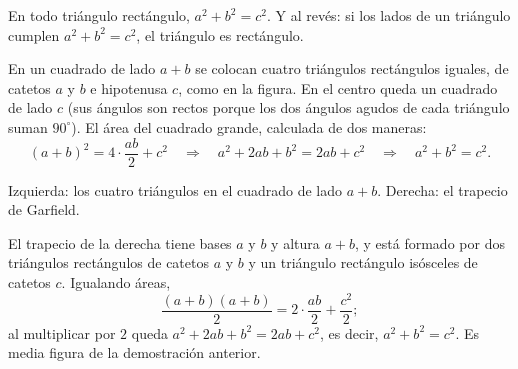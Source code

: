 \documentclass[11pt]{article}
\begin{document}
\begin{teorema}
En todo triángulo rectángulo, $a^2 + b^2 = c^2$. Y al revés: si los lados
de un triángulo cumplen $a^2 + b^2 = c^2$, el triángulo es rectángulo.
\end{teorema}

\begin{ejemplo}
En un cuadrado de lado $a + b$ se colocan cuatro triángulos rectángulos
iguales, de catetos $a$ y $b$ e hipotenusa $c$, como en la figura. En el
centro queda un cuadrado de lado $c$ (sus ángulos son rectos porque los dos
ángulos agudos de cada triángulo suman $90^\circ$). El área del cuadrado
grande, calculada de dos maneras:
\[
  (a + b)^2 = 4 \cdot \frac{ab}{2} + c^2
  \quad\Longrightarrow\quad a^2 + 2ab + b^2 = 2ab + c^2
  \quad\Longrightarrow\quad a^2 + b^2 = c^2.
\]
\end{ejemplo}

\begin{center}

{\small Izquierda: los cuatro triángulos en el cuadrado de lado $a + b$.
Derecha: el trapecio de Garfield.}
\end{center}

\begin{ejemplo}
El trapecio de la derecha tiene bases $a$ y $b$ y altura $a + b$, y está
formado por dos triángulos rectángulos de catetos $a$ y $b$ y un triángulo
rectángulo isósceles de catetos $c$. Igualando áreas,
\[
  \frac{(a + b)(a + b)}{2} = 2 \cdot \frac{ab}{2} + \frac{c^2}{2};
\]
al multiplicar por $2$ queda $a^2 + 2ab + b^2 = 2ab + c^2$, es decir,
$a^2 + b^2 = c^2$. Es media figura de la demostración anterior.
\end{ejemplo}
\end{document}

